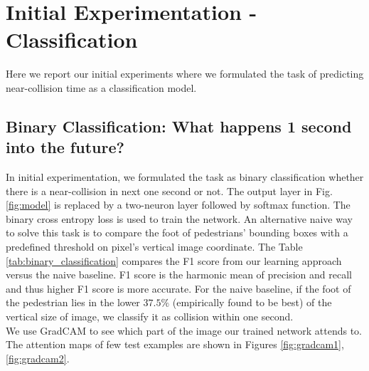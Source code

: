 \section{Initial Experimentation - Classification}
Here we report our initial experiments where we formulated the task of predicting near-collision time as a classification model. 

\subsection{Binary Classification: What happens 1 second into the future?}

In initial experimentation, we formulated the task as binary classification whether there is a near-collision in next one second or not. The output layer in Fig. \ref{fig:model} is replaced by a two-neuron layer followed by softmax function. The binary cross entropy loss is used to train the network. An alternative naive way to solve this task is to compare the foot of pedestrians' bounding boxes with a predefined threshold on pixel's vertical image coordinate. The Table \ref{tab:binary_classification} compares the F1 score from our learning approach versus the naive baseline. F1 score is the harmonic mean of precision and recall and thus higher F1 score is more accurate. For the naive baseline, if the foot of the pedestrian lies in the lower $37.5\%$ (empirically found to be best) of the vertical size of image, we classify it as collision within one second.  \\

We use GradCAM \cite{gradCAM} to see which part of the image our trained network attends to. The attention maps of few test examples are shown in Figures \ref{fig:gradcam1}, \ref{fig:gradcam2}.


